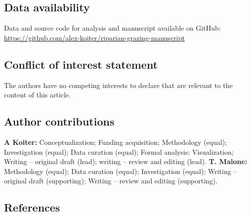 \documentclass[
]{agujournal2019}
\begin{document}
\subsection*{Data availability}\label{data-availability}

Data and source code for analysis and manuscript available on GitHub:
\url{https://github.com/alex-koiter/riparian-grazing-manuscript}

\subsection*{Conflict of interest
statement}\label{conflict-of-interest-statement}

The authors have no competing interests to declare that are relevant to
the content of this article.

\subsection*{Author contributions}\label{author-contributions}

\textbf{A Koiter:} Conceptualization; Funding acquisition; Methodology
(equal); Investigation (equal); Data curation (equal); Formal analysis;
Visualization; Writing -- original draft (lead); writing -- review and
editing (lead). \textbf{T. Malone:} Methodology (equal); Data curation
(equal); Investigation (equal); Writing -- original draft (supporting);
Writing -- review and editing (supporting).

\subsection*{References}\label{references}
\end{document}
